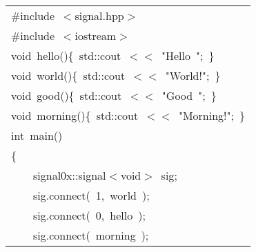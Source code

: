 \documentclass[9pt,onside,a4paper]{article}
\newcommand{\hlstd}[1]{\textcolor[rgb]{0.2,0,0.4}{#1}}
\newcommand{\hlnum}[1]{\textcolor[rgb]{0.2,0.73,0.02}{#1}}
\newcommand{\hlstr}[1]{\textcolor[rgb]{0.09,0.38,0.65}{#1}}
\newcommand{\hlppc}[1]{\textcolor[rgb]{0.33,0.45,0.69}{#1}}
\newcommand{\hlopt}[1]{\textcolor[rgb]{0.33,0.33,0.33}{#1}}
\newcommand{\hlkwb}[1]{\textcolor[rgb]{0.96,0.55,0.14}{#1}}
\newcommand{\hlkwd}[1]{\textcolor[rgb]{0.82,0.11,0.93}{#1}}
\begin{document}
\ttfamily
\begin{center}
\begin{xtabular}{||l||}
\hline
\hlstd{}\hlppc{\#include\ $<$signal.hpp$>$}\hspace*{\fill}\\
\hlstd{}\hlppc{\#include\ $<$iostream$>$}\hspace*{\fill}\\
\hlstd{}\hlkwb{void\ }\hlstd{}\hlkwd{hello}\hlstd{}\hlopt{()\{\ }\hlstd{std}\hlopt{::}\hlstd{cout\ }\hlopt{$<$$<$\ }\hlstd{}\hlstr{"Hello\ "}\hlstd{}\hlopt{;\ \}}\hspace*{\fill}\\
\hlstd{}\hlkwb{void\ }\hlstd{}\hlkwd{world}\hlstd{}\hlopt{()\{\ }\hlstd{std}\hlopt{::}\hlstd{cout\ }\hlopt{$<$$<$\ }\hlstd{}\hlstr{"World!"}\hlstd{}\hlopt{;\ \}}\hspace*{\fill}\\
\hlstd{}\hlkwb{void\ }\hlstd{}\hlkwd{good}\hlstd{}\hlopt{()\{\ }\hlstd{std}\hlopt{::}\hlstd{cout\ }\hlopt{$<$$<$\ }\hlstd{}\hlstr{"Good\ "}\hlstd{}\hlopt{;\ \}}\hspace*{\fill}\\
\hlstd{}\hlkwb{void\ }\hlstd{}\hlkwd{morning}\hlstd{}\hlopt{()\{\ }\hlstd{std}\hlopt{::}\hlstd{cout\ }\hlopt{$<$$<$\ }\hlstd{}\hlstr{"Morning!"}\hlstd{}\hlopt{;\ \}}\hspace*{\fill}\\
\hlstd{}\hlkwb{int\ }\hlstd{}\hlkwd{main}\hlstd{}\hlopt{()}\hspace*{\fill}\\
\hlstd{}\hlopt{\{}\hspace*{\fill}\\
\hlstd{}\hlstd{\ \ \ \ }\hlstd{signal0x}\hlopt{::}\hlstd{signal}\hlopt{$<$}\hlstd{}\hlkwb{void}\hlstd{}\hlopt{$>$\ }\hlstd{sig}\hlopt{;}\hspace*{\fill}\\
\hlstd{}\hlstd{\ \ \ \ }\hlstd{sig}\hlopt{.}\hlstd{}\hlkwd{connect}\hlstd{}\hlopt{(\ }\hlstd{}\hlnum{1}\hlstd{}\hlopt{,\ }\hlstd{world\ }\hlopt{);}\hspace*{\fill}\\
\hlstd{}\hlstd{\ \ \ \ }\hlstd{sig}\hlopt{.}\hlstd{}\hlkwd{connect}\hlstd{}\hlopt{(\ }\hlstd{}\hlnum{0}\hlstd{}\hlopt{,\ }\hlstd{hello\ }\hlopt{);}\hspace*{\fill}\\
\hlstd{}\hlstd{\ \ \ \ }\hlstd{sig}\hlopt{.}\hlstd{}\hlkwd{connect}\hlstd{}\hlopt{(\ }\hlstd{morning\ }\hlopt{);}\hspace*{\fill}\\

\end{xtabular}
\end{center}
\end{document}
